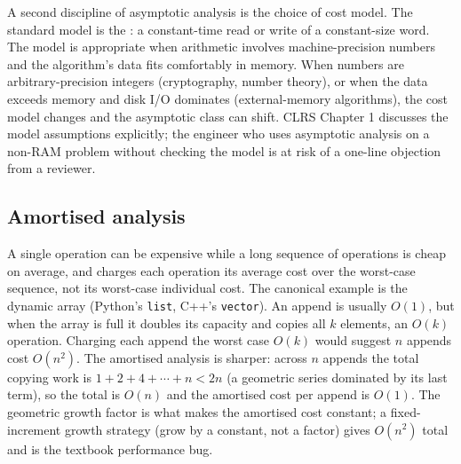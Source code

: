 \begin{mastery}
A second discipline of asymptotic analysis is the choice of cost
model. The standard model is the : a constant-time
read or write of a constant-size word. The model is appropriate when
arithmetic involves machine-precision numbers and the algorithm's
data fits comfortably in memory. When numbers are arbitrary-precision
integers (cryptography, number theory), or when the data exceeds
memory and disk I/O dominates (external-memory algorithms), the cost
model changes and the asymptotic class can shift. CLRS Chapter 1
\cite{text:cormen-clrs} discusses the model assumptions explicitly;
the engineer who uses asymptotic analysis on a non-RAM problem
without checking the model is at risk of a one-line objection from a
reviewer.
\end{mastery}

\subsection{Amortised analysis}

A single operation can be expensive while a long sequence of
operations is cheap on average, and 
charges each operation its average cost over the worst-case
sequence, not its worst-case individual cost. The canonical example
is the dynamic array (Python's \texttt{list}, C++'s
\texttt{vector}). An append is usually $O(1)$, but when the array is
full it doubles its capacity and copies all $k$ elements, an $O(k)$
operation. Charging each append the worst case $O(k)$ would suggest
$n$ appends cost $O(n^{2})$. The amortised analysis is sharper:
across $n$ appends the total copying work is $1 + 2 + 4 + \cdots +
n < 2n$ (a geometric series dominated by its last term), so the
total is $O(n)$ and the amortised cost per append is $O(1)$. The
geometric growth factor is what makes the amortised cost constant; a
fixed-increment growth strategy (grow by a constant, not a factor)
gives $O(n^{2})$ total and is the textbook performance bug.

